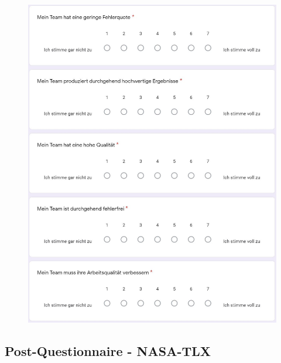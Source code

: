 \documentclass[a4paper,11pt]{article}%
\renewcommand{\\}{\vspace*{0.5\baselineskip} \newline}
\begin{document}
{{	\begin{figure}[H]
	\centering
		\begin{footnotesize}
			\includegraphics[scale=0.6]{Abbildungen/Fragebogen/Post-Questionnaire/PQTE1}
		\end{footnotesize}
	\end{figure}	

\newpage
\subsection{Post-Questionnaire - NASA-TLX}
\label{Post-Questionnaire - NASA-TLX}

}}
\end{document}
